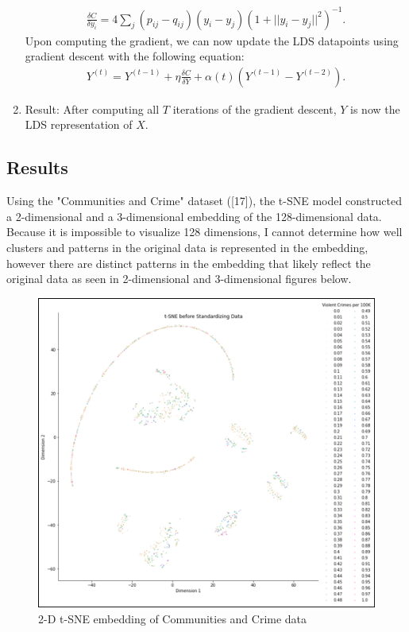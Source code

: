 \documentclass[11pt]{article}
\begin{document}
\begin{enumerate}
    \begin{align}
        \frac{\delta C}{\delta y_i} =  4\sum_j (p_{ij} - q_{ij})(y_i - y_j)(1 + ||y_i - y_j||^2)^{-1}.
    \end{align}
    Upon computing the gradient, we can now update the LDS datapoints using gradient descent with the following equation:
    \begin{align}
        Y^{(t)} = Y^{(t-1)} + \eta\frac{\delta C}{\delta Y} + \alpha(t)(Y^{(t-1)} - Y^{(t-2)}).
    \end{align}
    \item Result:\newline
    After computing all $T$ iterations of the gradient descent, $Y$ is now the LDS representation of $X$.
\end{enumerate}

\subsection{Results}
\hspace{5mm}Using the "Communities and Crime" dataset ([17]), the t-SNE model constructed a 2-dimensional and a 3-dimensional embedding of the 128-dimensional data. Because it is impossible to visualize 128 dimensions, I cannot determine how well clusters and patterns in the original data is represented in the embedding, however there are distinct patterns in the embedding that likely reflect the original data as seen in 2-dimensional and 3-dimensional figures below.
\begin{figure}[h!]
\centering
\includegraphics[scale=0.6]{tsne before standardizing.png}
\caption{2-D t-SNE embedding of Communities and Crime data}
\label{fig: t_SNE before standardizing}
\end{figure}
\end{document}
